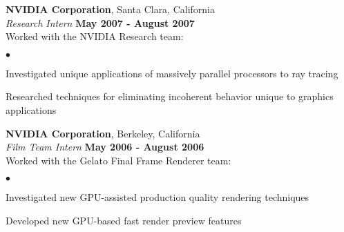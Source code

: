 \documentclass[margin,line]{res}
\newenvironment{list2}{
  \begin{list}{$\bullet$}{%
      \setlength{\itemsep}{0in}
      \setlength{\parsep}{0in} \setlength{\parskip}{0in}
      \setlength{\topsep}{0in} \setlength{\partopsep}{0in}
      \setlength{\leftmargin}{0.2in}}}{\end{list}}
\begin{document}
\begin{resume}
{\bf NVIDIA Corporation}, Santa Clara, California\\
{\em Research Intern} \hfill {\bf May 2007 - August 2007}\\
Worked with the NVIDIA Research team: \vspace*{.05in}
\begin{list2}
\item Investigated unique applications of massively parallel processors to ray tracing
\item Researched techniques for eliminating incoherent behavior unique to graphics applications
\end{list2}

{\bf NVIDIA Corporation}, Berkeley, California\\
{\em Film Team Intern} \hfill {\bf May 2006 - August 2006}\\
Worked with the Gelato Final Frame Renderer team: \vspace*{.05in}
\begin{list2}
\item Investigated new GPU-assisted production quality rendering techniques
\item Developed new GPU-based fast render preview features
\end{list2}



\end{resume}
\end{document}
